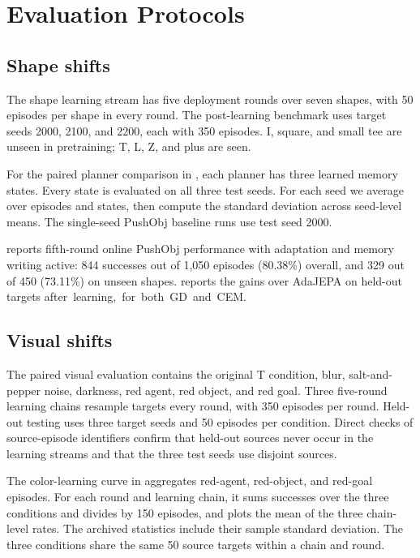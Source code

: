\section{Evaluation Protocols}
\label{app:protocols}

\subsection{Shape shifts}
The shape learning stream has five deployment rounds over seven shapes, with 50 episodes per shape in every round. The post-learning benchmark uses target seeds 2000, 2100, and 2200, each with 350 episodes. I, square, and small tee are unseen in pretraining; T, L, Z, and plus are seen.

For the paired planner comparison in , each planner has three learned memory states. Every state is evaluated on all three test seeds. For each seed we average over episodes and states, then compute the standard deviation across seed-level means. The single-seed PushObj baseline runs use test seed 2000.

 reports fifth-round online PushObj performance with adaptation and memory writing active: 844 successes out of 1,050 episodes (80.38\%) overall, and 329 out of 450 (73.11\%) on unseen shapes.  reports the gains over AdaJEPA on held-out targets \mbox{after learning, for both GD and CEM}.

\subsection{Visual shifts}
The paired visual evaluation contains the original T condition, blur, salt-and-pepper noise, darkness, red agent, red object, and red goal. Three five-round learning chains resample targets every round, with 350 episodes per round. Held-out testing uses three target seeds and 50 episodes per condition. Direct checks of source-episode identifiers confirm that held-out sources never occur in the learning streams and that the three test seeds use disjoint sources.

The color-learning curve in  aggregates red-agent, red-object, and red-goal episodes. For each round and learning chain, it sums successes over the three conditions and divides by 150 episodes, and plots the mean of the three chain-level rates. The archived statistics include their sample standard deviation. The three conditions share the same 50 source targets within a chain and round.


